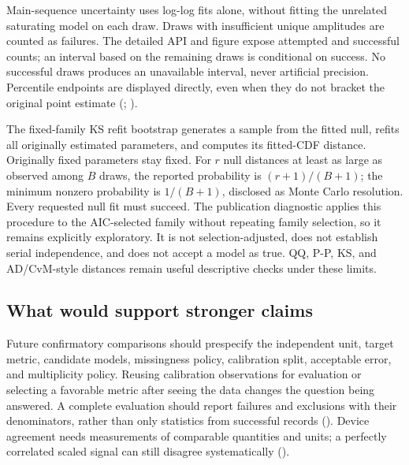 \documentclass[
]{article}
\begin{document}
Main-sequence uncertainty uses log-log fits alone, without fitting the
unrelated saturating model on each draw. Draws with insufficient unique
amplitudes are counted as failures. The detailed API and figure expose
attempted and successful counts; an interval based on the remaining
draws is conditional on success. No successful draws produces an
unavailable interval, never artificial precision. Percentile endpoints
are displayed directly, even when they do not bracket the original point
estimate (;
).

The fixed-family KS refit bootstrap generates a sample from the fitted
null, refits all originally estimated parameters, and computes its
fitted-CDF distance. Originally fixed parameters stay fixed. For \(r\)
null distances at least as large as observed among \(B\) draws, the
reported probability is \((r+1)/(B+1)\); the minimum nonzero probability
is \(1/(B+1)\), disclosed as Monte Carlo resolution. Every requested
null fit must succeed. The publication diagnostic applies this procedure
to the AIC-selected family without repeating family selection, so it
remains explicitly exploratory. It is not selection-adjusted, does not
establish serial independence, and does not accept a model as true. QQ,
P-P, KS, and AD/CvM-style distances remain useful descriptive checks
under these limits.

\subsection{What would support stronger
claims}\label{what-would-support-stronger-claims}

Future confirmatory comparisons should prespecify the independent unit,
target metric, candidate models, missingness policy, calibration split,
acceptable error, and multiplicity policy. Reusing calibration
observations for evaluation or selecting a favorable metric after seeing
the data changes the question being answered. A complete evaluation
should report failures and exclusions with their denominators, rather
than only statistics from successful records
(). Device
agreement needs measurements of comparable quantities and units; a
perfectly correlated scaled signal can still disagree systematically
().
\end{document}
